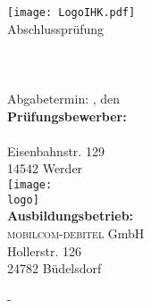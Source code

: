 \thispagestyle{plain}
\begin{titlepage}

\begin{center}
\texttt{[image: LogoIHK.pdf]}\\[1ex]
\Large{Abschlussprüfung \pruefungstermin}\\[3ex]

\Large{\ausbildungsberuf}\\
\LARGE{\betreff}\\[4ex]

\huge{\textbf{\titel}}\\[1.5ex]

\normalsize
Abgabetermin: \ort, den \abgabetermin\\[3em]
\textbf{Prüfungsbewerber:}\\
\autor\\
Eisenbahnstr. 129\\
14542 Werder\\[5ex]

\texttt{[image: \\logo]}\\[2ex]
\textbf{Ausbildungsbetrieb:}\\
\textsc{mobilcom-debitel} GmbH\\
Hollerstr. 126\\
24782 Büdelsdorf\\[5em]
\end{center}

\small
\noindent
-
\end{titlepage}